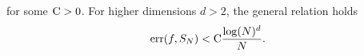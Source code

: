 for some $\textrm{C}>0$.
For higher dimensions $d>2$, the general relation holds
\begin{equation}
\textrm{err}(f, S_N)<\textrm{C} \frac{\log(N)^d}{N}.
\end{equation}
